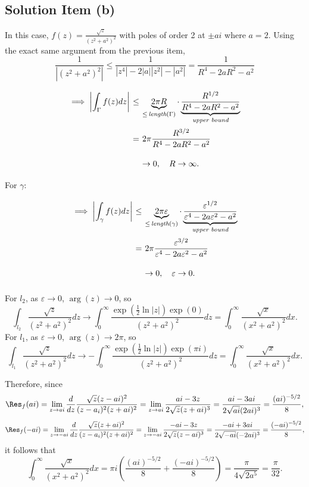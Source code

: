 \subsection*{Solution Item (b)}

In this case, $f(z) = \frac{\sqrt{z}}{(z^2 + a^2)^2}$ with poles of order 2 at $\pm ai$ where $a = 2$. Using the exact same argument from the previous item,
\[ \frac{1}{|(z^2+ a^2)^2|} \leq \frac{1}{|z^4| - 2|a||z^2| - |a^2|} = \frac{1}{R^4 - 2aR^2 - a^2} \]
\[ \everymath{\displaystyle}
\arraycolsep=1.8pt\def\arraystretch{2.5}
\begin{array}{rcl}
    \implies \left| \int_{\Gamma} f(z) dz \right| & \leq & \underbrace{2\pi R}_{\leq\,\textit{length}(\Gamma)} \cdot \underbrace{\frac{R^{1/2}}{R^4 - 2aR^2 - a^2}}_{\textit{upper bound}}\\
    & = & 2\pi \frac{R^{3/2}}{R^4 - 2aR^2 - a^2 }\\
    & & \to 0,\hspace{1em} R\to \infty.
\end{array} \]
For $\gamma$:
\[ \everymath{\displaystyle}
\arraycolsep=1.8pt\def\arraystretch{2.5}
\begin{array}{rcl}
    \implies \left| \int_{\gamma} f(z) dz \right| & \leq & \underbrace{2\pi \varepsilon}_{\leq\,\textit{length}(\gamma)} \cdot \underbrace{\frac{\varepsilon^{1/2}}{\varepsilon^4 - 2a\varepsilon^2 - a^2}}_{\textit{upper bound}}\\
    & = & 2\pi \frac{\varepsilon^{3/2}}{\varepsilon^4 - 2a\varepsilon^2 - a^2 }\\
    & & \to 0,\hspace{1em} \varepsilon\to 0.
\end{array} \]

For $l_2$, as $\varepsilon \to 0$, $\arg(z) \to 0$, so
\[ \int_{l_2} \frac{\sqrt{z}}{(z^2 + a^2)^2} dz \to \int_{0}^{\infty} \frac{\exp\left( \frac{1}{2} \ln|z| \right)\exp\left( 0\right)}{(z^2 + a^2)^2} dz = \int_{0}^{\infty} \frac{\sqrt{x}}{(x^2 + a^2)^2} dx. \]
For $l_1$, as $\varepsilon \to 0$, $\arg(z) \to 2\pi$, so
\[ \int_{l_1} \frac{\sqrt{z}}{(z^2 + a^2)^2} dz \to -\int_{0}^{\infty} \frac{\exp\left( \frac{1}{2} \ln|z| \right)\exp\left( \pi i\right)}{(z^2 + a^2)^2} dz = \int_{0}^{\infty} \frac{\sqrt{x}}{(x^2 + a^2)^2} dx. \]

Therefore, since
\[ \Res_f(ai) = \lim_{z\to ai} \frac{d}{dz}\frac{\sqrt{z}(z-ai)^2}{(z-a_i)^2(z+ai)^2} = \lim_{z\to ai} \frac{ai-3z}{2\sqrt{z}(z+ai)^3} = \frac{ai-3ai}{2\sqrt{ai}(2ai)^{3}} = \frac{(ai)^{-5/2}}{8},\]
\[ \Res_f(-ai) = \lim_{z\to -ai} \frac{d}{dz}\frac{\sqrt{z}(z+ai)^2}{(z-a_i)^2(z+ai)^2} = \lim_{z\to -ai} \frac{-ai-3z}{2\sqrt{z}(z-ai)^3} = \frac{-ai+3ai}{2\sqrt{-ai}(-2ai)^{3}} = \frac{(-ai)^{-5/2}}{8},\]
it follows that 
\[  \int_{0}^{\infty} \frac{\sqrt{x}}{(x^2 + a^2)^2} dx = \pi i \left( \frac{(ai)^{-5/2}}{8} + \frac{(-ai)^{-5/2}}{8} \right) = \frac{\pi}{4 \sqrt{2a^5}} = \frac{\pi}{32} . \]